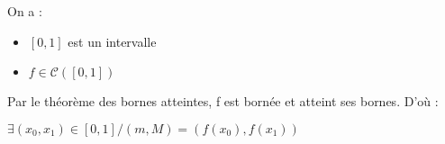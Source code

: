 On a :
\begin{itemize}
  \item $[0, 1]$ est un intervalle
  \item $f \in \mathcal{C}([0, 1])$
\end{itemize}

Par le théorème des bornes atteintes, f est bornée et atteint ses bornes. D'où :
\begin{result}
  $\exists (x_0, x_1) \in [0, 1] / (m, M) = \left(f(x_0), f(x_1)\right)$
\end{result}
